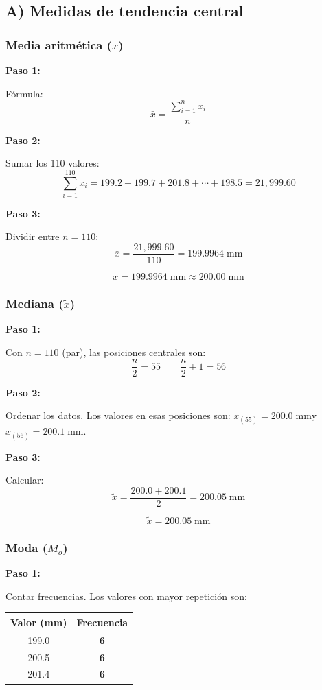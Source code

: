 \documentclass[12pt,letterpaper]{article}
\newcommand{\resultado}[2][Resultado]{%
  \begin{tcolorbox}[resultadoStyle, title={#1}]#2\end{tcolorbox}}
\newcommand{\paso}[1]{%
  \vspace{4pt}%
  \begin{tcolorbox}[pasoStyle]%
    \textbf{\color{azulprin}Paso #1:}%
  \end{tcolorbox}%
  \vspace{2pt}}
\newcommand{\formula}[1]{\vspace{2pt}\[ #1 \]\vspace{-4pt}}
\begin{document}
\subsection{A) Medidas de tendencia central}

\subsubsection*{Media aritm\'etica ($\bar{x}$)}

\paso{1} F\'ormula:
\formula{\bar{x} = \frac{\displaystyle\sum_{i=1}^{n} x_i}{n}}

\paso{2} Sumar los 110 valores:
\formula{\sum_{i=1}^{110} x_i = 199.2 + 199.7 + 201.8 + \cdots + 198.5 = 21{,}999.60}

\paso{3} Dividir entre $n = 110$:
\formula{\bar{x} = \frac{21{,}999.60}{110} = 199.9964\;\text{mm}}

\resultado[$\bar{x}$ -- Media]{\[ \bar{x} = 199.9964\;\text{mm} \approx 200.00\;\text{mm} \]}

\subsubsection*{Mediana ($\tilde{x}$)}

\paso{1} Con $n = 110$ (par), las posiciones centrales son:
\formula{\frac{n}{2} = 55 \qquad \frac{n}{2}+1 = 56}

\paso{2} Ordenar los datos. Los valores en esas posiciones son:
$x_{(55)} = 200.0\;\text{mm}$\quad y\quad $x_{(56)} = 200.1\;\text{mm}$.

\paso{3} Calcular:
\formula{\tilde{x} = \frac{200.0 + 200.1}{2} = 200.05\;\text{mm}}

\resultado[$\tilde{x}$ -- Mediana]{\[ \tilde{x} = 200.05\;\text{mm} \]}

\subsubsection*{Moda ($M_o$)}

\paso{1} Contar frecuencias. Los valores con mayor repetici\'on son:

\begin{center}
\begin{tabular}{cc}
\toprule
\rowcolor{azulclaro}
\textbf{Valor (mm)} & \textbf{Frecuencia} \\
\midrule
199.0 & \textbf{6} \\
\rowcolor{grisclaro} 200.5 & \textbf{6} \\
201.4 & \textbf{6} \\
\bottomrule
\end{tabular}
\end{center}
\end{document}

